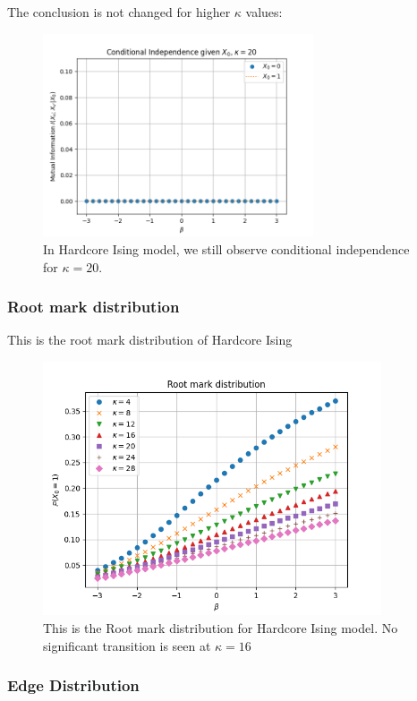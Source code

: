 \documentclass[12pt]{article}
\numberwithin{equation}{section}
\begin{document}
The conclusion is not changed for higher $\kappa$ values:
\begin{figure}[h]
    \centering
    \includegraphics[width=8cm]{img/HA_Ising/CI_kappa20.png}
    \caption{In Hardcore Ising model, we still observe conditional independence for $\kappa=20$.}
    \label{Fig.HAIS-CI-large-kappa}
\end{figure}

\subsubsection{Root mark distribution}

This is the root mark distribution of Hardcore Ising
\begin{figure}[h]
    \centering
    \includegraphics[width=10cm]{img/HA_Ising/RM_raw.png}
    \caption{This is the Root mark distribution for Hardcore Ising model. No significant transition is seen at $\kappa=16$}
    \label{Fig.HAIS-RM}
\end{figure}

\newpage

\subsubsection{Edge Distribution}
\end{document}
